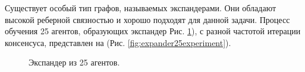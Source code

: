 \documentclass[a4paper,article,14pt]{extarticle}
\begin{document}
Существует особый тип графов, называемых экспандерами. Они обладают высокой реберной связностью и хорошо подходят для данной задачи. Процесс обучения 25 агентов, образующих экспандер Рис. \ref{fig:expander25}), с разной частотой итерации консенсуса, представлен на (Рис. \ref{fig:expander25experiment}).

\begin{figure}[H]
\begin{center}
\caption{ \label{fig:expander25}
     Экспандер из 25 агентов.}
\end{center}
\end{figure}
\end{document}
